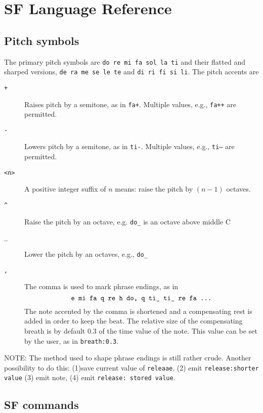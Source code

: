 \documentclass[11pt]{amsart}
\begin{document}
\section{SF Language Reference}
\label{sec:SFLR}

\subsection{Pitch symbols}

The primary pitch symbols are {\tt do re mi fa sol la ti} and their
flatted and sharped versions, {\tt de ra me se le te} and
{\tt di ri fi si li}.  The pitch accents are

\begin{description}

\item[{\tt +}]  Raises pitch by a semitone, as in {\tt fa+}. Multiple
values, e.g., {\tt fa++} are permitted.

\item[{\tt -}]  Lowers pitch by a semitone, as in {\tt ti-}. Multiple
values, e.g., {\tt ti--} are permitted.

\item[{\tt <n>} ] A positive integer suffix of $n$ means: raise the pitch
by $(n-1)$ octaves.

\item[{\tt\^{}}]  Raise the pitch
by an octave, e.g. {\tt do\_} is an octave above middle C


\item[{\tt\_{}} ] Lower the pitch
by an octaves, e.g., {\tt do\_ }

\item[{\tt ,}]   The comma is used to mark phrase endings, as in 
\[
  \hbox{{\tt e mi fa q re h do, q ti\_ ti\_ re fa ...}}
\]
The note accented by the comma is shortened and a compensating rest is added
in order to keep the beat.  The relative size of the compensating breath
is by default 0.3 of the time value of the note.  This value can be set
by the user, as in {\tt breath:0.3}.  

\end{description}

NOTE:  The method used to shape phrase endings is still rather crude.  Another 
possibility to do this: (1)save current value of {\tt releaae}, 
(2) emit {\tt release:shorter value} (3) emit note, (4) emit {\tt release: stored value}.



\subsection{SF commands}
\end{document}
